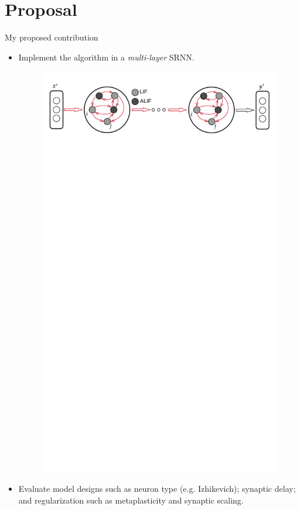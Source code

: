\documentclass[t]{beamer}
\begin{document}
\section{Proposal}
\begin{frame}{My proposed contribution}
\begin{itemize}[label=--]
\item Implement the algorithm in a \emph{multi-layer} SRNN.
	\begin{figure}[!ht]
		\includegraphics[clip, trim=0cm 25cm 0cm 0cm, width=0.667\linewidth]{BellecDiagramML.pdf}  %
	\end{figure}
\item Evaluate model designs such as neuron type (e.g. Izhikevich); synaptic delay; and regularization such as metaplasticity and synaptic scaling.
\end{itemize}
	
\end{frame}
\end{document}
